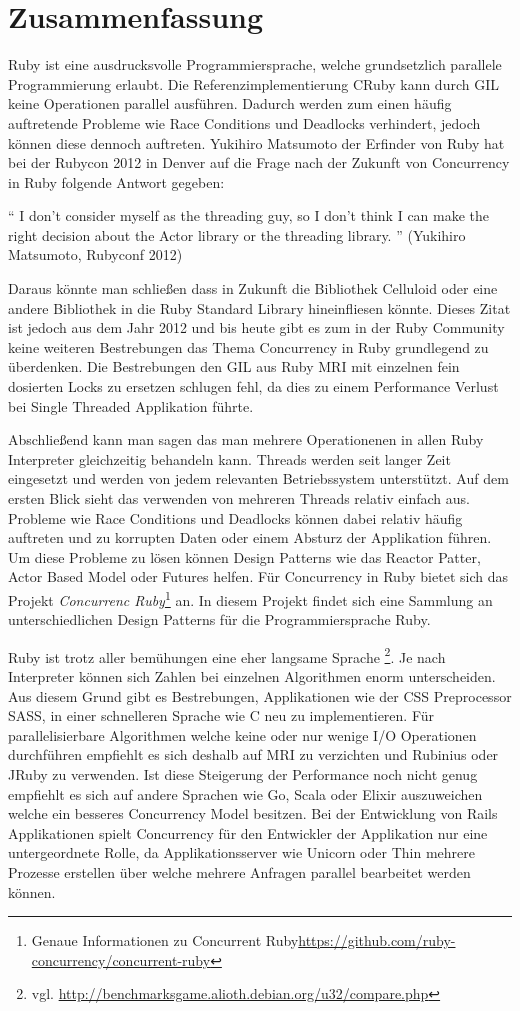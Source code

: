 \section{Zusammenfassung}
Ruby ist eine ausdrucksvolle Programmiersprache, welche grundsetzlich parallele Programmierung erlaubt. Die Referenzimplementierung CRuby kann durch GIL keine Operationen parallel ausführen. Dadurch werden zum einen häufig auftretende Probleme wie Race Conditions und Deadlocks verhindert, jedoch können diese dennoch auftreten. Yukihiro Matsumoto der Erfinder von Ruby hat bei der Rubycon 2012 in Denver auf die Frage nach der Zukunft von Concurrency in Ruby folgende Antwort gegeben:

	``
	I don't consider myself as the threading guy, so I don't think I can make the right decision about the Actor library or the threading library.
	'' (Yukihiro Matsumoto, Rubyconf 2012)

Daraus könnte man schließen dass in Zukunft die Bibliothek Celluloid oder eine andere Bibliothek in die Ruby Standard Library hineinfliesen könnte. Dieses Zitat ist jedoch aus dem Jahr 2012 und bis heute gibt es zum in der Ruby Community keine weiteren Bestrebungen das Thema Concurrency in Ruby grundlegend zu überdenken. Die Bestrebungen den GIL aus Ruby MRI mit einzelnen fein dosierten Locks zu ersetzen schlugen fehl, da dies zu einem Performance Verlust bei Single Threaded Applikation führte. 

Abschließend kann man sagen das man mehrere Operationenen in allen Ruby Interpreter gleichzeitig behandeln kann. Threads werden seit langer Zeit eingesetzt und werden von jedem relevanten Betriebssystem unterstützt. Auf dem ersten Blick sieht das verwenden von mehreren Threads relativ einfach aus. Probleme wie Race Conditions und Deadlocks können dabei relativ häufig auftreten und zu korrupten Daten oder einem Absturz der Applikation führen. Um diese Probleme zu lösen können Design Patterns wie das Reactor Patter, Actor Based Model oder Futures helfen. Für Concurrency in Ruby bietet sich das Projekt \emph{Concurrenc Ruby}\footnote{Genaue Informationen zu Concurrent Ruby\url{https://github.com/ruby-concurrency/concurrent-ruby}} an. In diesem Projekt findet sich eine Sammlung an unterschiedlichen Design Patterns für die Programmiersprache Ruby.

Ruby ist trotz aller bemühungen eine eher langsame Sprache \footnote{vgl. \url{http://benchmarksgame.alioth.debian.org/u32/compare.php}}. Je nach Interpreter können sich Zahlen bei einzelnen Algorithmen enorm unterscheiden. Aus diesem Grund gibt es Bestrebungen, Applikationen wie der CSS Preprocessor SASS, in einer schnelleren Sprache wie C neu zu implementieren. Für parallelisierbare Algorithmen welche keine oder nur wenige I/O Operationen durchführen empfiehlt es sich deshalb auf MRI zu verzichten und Rubinius oder JRuby zu verwenden. Ist diese Steigerung der Performance noch nicht genug empfiehlt es sich auf andere Sprachen wie Go, Scala oder Elixir auszuweichen welche ein besseres Concurrency Model besitzen. Bei der Entwicklung von Rails Applikationen spielt Concurrency für den Entwickler der Applikation nur eine untergeordnete Rolle, da Applikationsserver wie Unicorn oder Thin mehrere Prozesse erstellen über welche mehrere Anfragen parallel bearbeitet werden können.